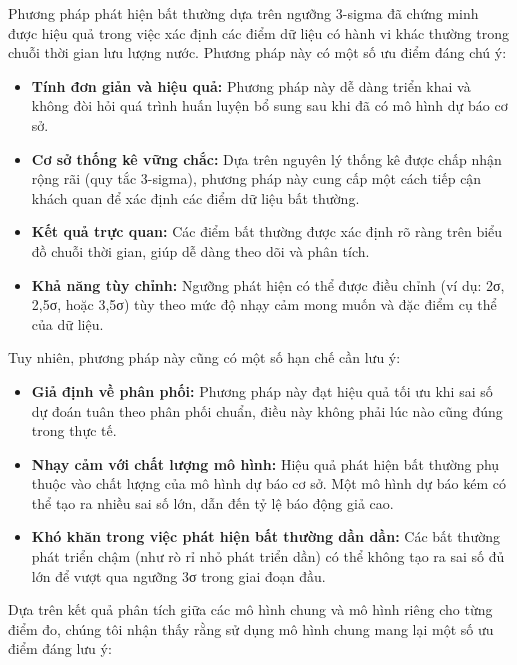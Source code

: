 Phương pháp phát hiện bất thường dựa trên ngưỡng 3-sigma đã chứng minh được hiệu quả trong việc xác định các điểm dữ liệu có hành vi khác thường trong chuỗi thời gian lưu lượng nước. Phương pháp này có một số ưu điểm đáng chú ý:

\begin{itemize}
    \item \textbf{Tính đơn giản và hiệu quả:} Phương pháp này dễ dàng triển khai và không đòi hỏi quá trình huấn luyện bổ sung sau khi đã có mô hình dự báo cơ sở.
    
    \item \textbf{Cơ sở thống kê vững chắc:} Dựa trên nguyên lý thống kê được chấp nhận rộng rãi (quy tắc 3-sigma), phương pháp này cung cấp một cách tiếp cận khách quan để xác định các điểm dữ liệu bất thường.
    
    \item \textbf{Kết quả trực quan:} Các điểm bất thường được xác định rõ ràng trên biểu đồ chuỗi thời gian, giúp dễ dàng theo dõi và phân tích.
    
    \item \textbf{Khả năng tùy chỉnh:} Ngưỡng phát hiện có thể được điều chỉnh (ví dụ: 2σ, 2,5σ, hoặc 3,5σ) tùy theo mức độ nhạy cảm mong muốn và đặc điểm cụ thể của dữ liệu.
\end{itemize}

Tuy nhiên, phương pháp này cũng có một số hạn chế cần lưu ý:

\begin{itemize}
    \item \textbf{Giả định về phân phối:} Phương pháp này đạt hiệu quả tối ưu khi sai số dự đoán tuân theo phân phối chuẩn, điều này không phải lúc nào cũng đúng trong thực tế.
    
    \item \textbf{Nhạy cảm với chất lượng mô hình:} Hiệu quả phát hiện bất thường phụ thuộc vào chất lượng của mô hình dự báo cơ sở. Một mô hình dự báo kém có thể tạo ra nhiều sai số lớn, dẫn đến tỷ lệ báo động giả cao.
    
    \item \textbf{Khó khăn trong việc phát hiện bất thường dần dần:} Các bất thường phát triển chậm (như rò rỉ nhỏ phát triển dần) có thể không tạo ra sai số đủ lớn để vượt qua ngưỡng 3σ trong giai đoạn đầu.
\end{itemize}

Dựa trên kết quả phân tích giữa các mô hình chung và mô hình riêng cho từng điểm đo, chúng tôi nhận thấy rằng sử dụng mô hình chung mang lại một số ưu điểm đáng lưu ý:

